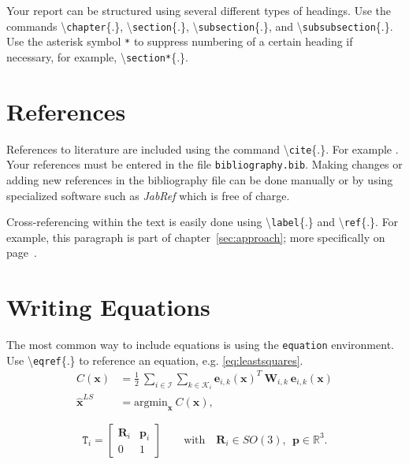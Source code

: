   Your report can be structured using several different types of headings. Use the commands \textbackslash\texttt{chapter}\{.\}, \textbackslash\texttt{section}\{.\}, \textbackslash\texttt{subsection}\{.\}, and \textbackslash\texttt{subsubsection}\{.\}. Use the asterisk symbol \texttt{*} to suppress numbering of a certain heading if necessary, for example, \textbackslash\texttt{section*}\{.\}.


\section{References}\label{sec:references}

  References to literature are included using the command \textbackslash\texttt{cite}\{.\}. For example \cite{KleinMurray2007,Strasdat2010WhyFilter}. Your references must be entered in the file \texttt{bibliography.bib}. Making changes or adding new references in the bibliography file can be done manually or by using specialized software such as \textit{JabRef} which is free of charge.

  Cross-referencing within the text is easily done using \textbackslash\texttt{label}\{.\} and \textbackslash\texttt{ref}\{.\}. For example, this paragraph is part of chapter~\ref{sec:approach}; more specifically on page~\pageref{sec:references}.

\section{Writing Equations}\label{sec:math}

  The most common way to include equations is using the \texttt{equation} environment. Use \textbackslash\texttt{eqref}\{.\} to reference an equation, e.g. \eqref{eq:leastsquares}.
  \begin{equation}\label{eq:leastsquares}
      \begin{aligned}
        C(\mathbf{x}) &= \frac{1}{2} \ \sum_{i \in \mathcal I} \sum_{k \in \mathcal K_i} \mathbf{e}_{i,k}(\mathbf{x})^T \ \mathbf{W}_{i,k}  \ \mathbf{e}_{i,k}(\mathbf{x})  \\
        \hat{\mathbf{x}}^{LS} &= \text{argmin}_\mathbf{x} \ C(\mathbf{x}),
      \end{aligned}
  \end{equation}

  \begin{equation}\label{eq:se3}
    \mathtt{T}_i = \begin{bmatrix}\mathbf{R}_i & \mathbf{p}_i \\ 0 & 1\end{bmatrix} \qquad \text{with} \quad \mathbf{R}_i \in SO(3), \ \ \mathbf{p} \in \mathbb{R}^3.
  \end{equation}

